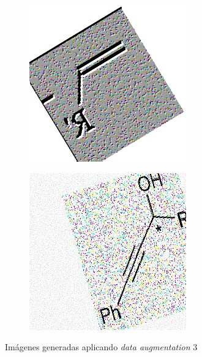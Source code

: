 \begin{figure}[H]
    \begin{subfigure}{.23\textwidth}
        \centering
        \includegraphics[width=1\linewidth]{imagenes/aug3/225.jpg}
    \end{subfigure}%
    \begin{subfigure}{.23\textwidth}
        \centering
        \includegraphics[width=1\linewidth]{imagenes/aug3/347.jpg}
    \end{subfigure}

    \caption{Imágenes generadas aplicando \textit{data augmentation} 3}
\end{figure}


